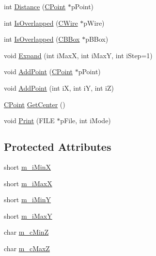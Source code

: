 \begin{DoxyCompactItemize}
\item 
int \mbox{\hyperlink{classCBBox_a010e8dd4f397c7d12e4d3a28f4952acf}{Distance}} (\mbox{\hyperlink{classCPoint}{C\+Point}} $\ast$p\+Point)
\item 
int \mbox{\hyperlink{classCBBox_ae38173ceac641fb233a941299764f519}{Is\+Overlapped}} (\mbox{\hyperlink{classCWire}{C\+Wire}} $\ast$p\+Wire)
\item 
int \mbox{\hyperlink{classCBBox_afbd0200a17c5610ec613482020213970}{Is\+Overlapped}} (\mbox{\hyperlink{classCBBox}{C\+B\+Box}} $\ast$p\+B\+Box)
\item 
void \mbox{\hyperlink{classCBBox_a21b22d3678d267b74b7e49e751edd711}{Expand}} (int i\+MaxX, int i\+MaxY, int i\+Step=1)
\item 
void \mbox{\hyperlink{classCBBox_a270d6116bfea826678ad54c2ab256a6c}{Add\+Point}} (\mbox{\hyperlink{classCPoint}{C\+Point}} $\ast$p\+Point)
\item 
void \mbox{\hyperlink{classCBBox_a7051785c6750497f2b09d04a7aee82bd}{Add\+Point}} (int iX, int iY, int iZ)
\item 
\mbox{\hyperlink{classCPoint}{C\+Point}} \mbox{\hyperlink{classCBBox_a08398476b46cfe26e2c825df2acc29ad}{Get\+Center}} ()
\item 
void \mbox{\hyperlink{classCBBox_a596b6427a7047a1827b0dfd2ab767ec3}{Print}} (F\+I\+LE $\ast$p\+File, int i\+Mode)
\end{DoxyCompactItemize}
\subsection*{Protected Attributes}
\begin{DoxyCompactItemize}
\item 
short \mbox{\hyperlink{classCBBox_a00c5a1305efcf94cd0b1a4ae04301b46}{m\+\_\+i\+MinX}}
\item 
short \mbox{\hyperlink{classCBBox_a183101a7e1ee8719300d68e7193c7a72}{m\+\_\+i\+MaxX}}
\item 
short \mbox{\hyperlink{classCBBox_afa02f0bfb935a21e343d172c5031de5d}{m\+\_\+i\+MinY}}
\item 
short \mbox{\hyperlink{classCBBox_a0f866a7a53bed98b77528695a5f68209}{m\+\_\+i\+MaxY}}
\item 
char \mbox{\hyperlink{classCBBox_afc4b2740aefede4cf451a8420e0ed96d}{m\+\_\+c\+MinZ}}
\item 
char \mbox{\hyperlink{classCBBox_a07308cfb95c86172b4d6d530f885ae1d}{m\+\_\+c\+MaxZ}}
\end{DoxyCompactItemize}


